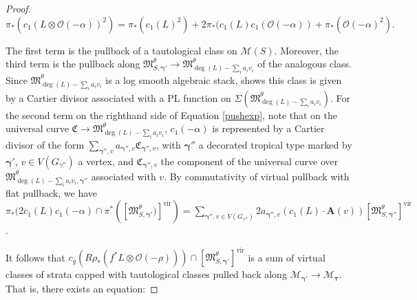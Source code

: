 \documentclass[12pt, oneside]{amsart}   	%
\newcommand{\vir}{\operatorname{vir}}
\numberwithin{equation}{section}
\numberwithin{thm}{section}
\numberwithin{figure}{section}
\begin{document}
\begin{proof}
\begin{equation}\label{pushexp}
\pi_*(c_1(L\otimes \mathcal{O}(-\alpha))^2) = \pi_*(c_1(L)^2) + 2\pi_*(c_1(L)c_1(\mathcal{O}(-\alpha)) + \pi_*(\mathcal{O}(-\alpha)^2).
\end{equation}

The first term is the pullback of a tautological class on $\mathscr{M}(S)$. Moreover, the third term is the pullback along $\mathfrak{M}^{\theta}_{S,\pmb\gamma'} \rightarrow \mathfrak{M}^\theta_{\deg(L) - \sum_i a_iv_i}$ of the analogous class. Since $\mathfrak{M}^\theta_{\deg(L) - \sum_i a_iv_i}$ is a log smooth algebraic stack, \cite[Theorem $67$]{logDR} shows this class is given by a Cartier divisor associated with a PL function on $\Sigma(\mathfrak{M}^\theta_{\deg(L) - \sum_i a_iv_i})$. For the second term on the righthand side of Equation \ref{pushexp}, note that on the universal curve $\mathfrak{C} \rightarrow \mathfrak{M}^\theta_{\deg(L) - \sum_i a_iv_i}$, $c_1(-\alpha)$ is represented by a Cartier divisor of the form $\sum_{\pmb\gamma'',v} a_{\pmb\gamma'',v}\mathfrak{C}_{\pmb\gamma'',v}$, with $\pmb\gamma''$ a decorated tropical type marked by $\pmb\gamma'$, $v \in V(G_{\gamma''})$ a vertex, and $\mathfrak{C}_{\pmb\gamma'',v}$ the component of the universal curve over $\mathfrak{M}^\theta_{\deg(L) - \sum_i a_iv_i,\pmb\gamma''}$ associated with $v$. By commutativity of virtual pullback with flat pullback, we have $\pi_*(2c_1(L)c_1(-\alpha)\cap\pi^*([\mathfrak{M}^{\theta}_{S,\pmb\gamma'})]^{\vir}) = \sum_{\pmb\gamma'',v \in V(G_{\gamma''})}2a_{\pmb\gamma'',v}(c_1(L)\cdot\textbf{A}(v))[\mathfrak{M}^{\theta}_{S,\pmb\gamma''}]^{\vir}$. 





 It follows that $c_g(R\rho_*(f^*L\otimes \mathcal{O}(-\rho)))\cap [\mathfrak{M}^{\theta}_{S,\pmb\gamma'}]^{\vir}$ is a sum of virtual classes of strata capped with tautological classes pulled back along $\mathscr{M}_{\pmb\gamma'} \rightarrow \mathscr{M}_{\pmb\tau}$. That is, there exists an equation:
 

\end{proof}
\end{document}
